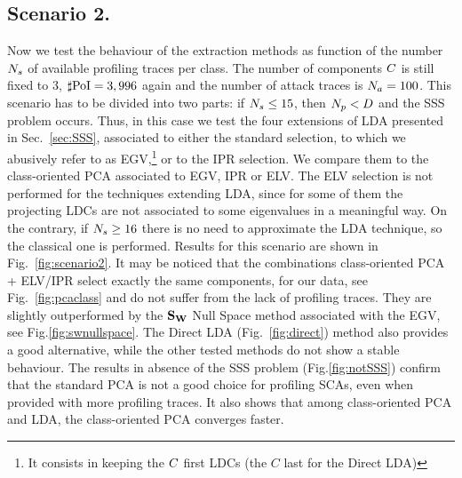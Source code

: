 \subsection{Scenario 2.}

Now we test the behaviour of the extraction methods as function of the number $N_{s}$ of available profiling traces per class. The number of components $C$ is still fixed to 3, $\sharp\mathrm{PoI}=3,996$ again and the number of attack traces is $N_a=100$. This scenario has to be divided into two parts: if $N_{s}\leq 15$, then $N_p<D$ and the SSS problem occurs. Thus, in this case we test the four extensions of LDA presented in Sec.~\ref{sec:SSS}, associated to either the standard selection, to which we abusively refer to as EGV,\footnote{It consists in keeping the $C$ first LDCs (the $C$ last for the Direct LDA)}
or to the IPR selection.  We compare them to the class-oriented PCA associated to EGV, IPR or ELV. The ELV selection is not performed for the techniques extending LDA, since for some of them the projecting LDCs are not associated to some eigenvalues in a meaningful way. On the contrary, if $N_{s} \geq 16$ there is no need to approximate the LDA technique, so the classical one is performed. Results for this scenario are shown in Fig.~\ref{fig:scenario2}. It may be noticed that the combinations class-oriented PCA + ELV/IPR select exactly the same components, for our data, see Fig.~\ref{fig:pcaclass} and do not suffer from the lack of profiling traces. They are slightly outperformed by the $\textbf{S}_{\textbf{W}}$ Null Space method associated with the EGV, see Fig.\ref{fig:swnullspace}. The Direct LDA (Fig.~\ref{fig:direct}) method also provides a good alternative, while the other tested methods do not show a stable behaviour. The results in absence of the SSS problem (Fig.\ref{fig:notSSS}) confirm that the standard PCA is not a good choice for profiling SCAs, even when provided with more profiling traces. It also shows that among class-oriented PCA and LDA, the class-oriented PCA converges faster.



